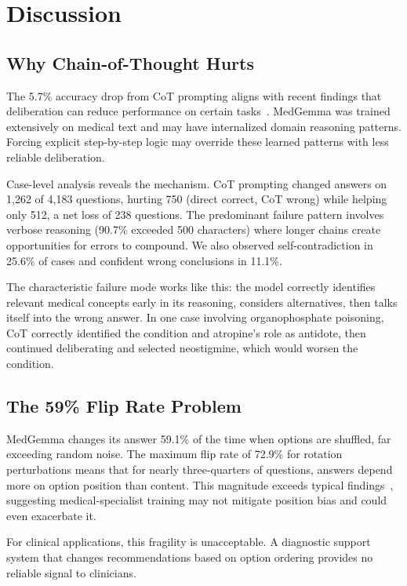 \documentclass[runningheads,a4paper]{llncs}
\begin{document}
\section{Discussion}

\subsection{Why Chain-of-Thought Hurts}

The 5.7\% accuracy drop from CoT prompting aligns with recent findings that deliberation can reduce performance on certain tasks~\cite{liu2024mindyourstep}. MedGemma was trained extensively on medical text and may have internalized domain reasoning patterns. Forcing explicit step-by-step logic may override these learned patterns with less reliable deliberation.

Case-level analysis reveals the mechanism. CoT prompting changed answers on 1,262 of 4,183 questions, hurting 750 (direct correct, CoT wrong) while helping only 512, a net loss of 238 questions. The predominant failure pattern involves verbose reasoning (90.7\% exceeded 500 characters) where longer chains create opportunities for errors to compound. We also observed self-contradiction in 25.6\% of cases and confident wrong conclusions in 11.1\%.

The characteristic failure mode works like this: the model correctly identifies relevant medical concepts early in its reasoning, considers alternatives, then talks itself into the wrong answer. In one case involving organophosphate poisoning, CoT correctly identified the condition and atropine's role as antidote, then continued deliberating and selected neostigmine, which would worsen the condition.

\subsection{The 59\% Flip Rate Problem}

MedGemma changes its answer 59.1\% of the time when options are shuffled, far exceeding random noise. The maximum flip rate of 72.9\% for rotation perturbations means that for nearly three-quarters of questions, answers depend more on option position than content. This magnitude exceeds typical findings~\cite{zheng2024llm}, suggesting medical-specialist training may not mitigate position bias and could even exacerbate it.

For clinical applications, this fragility is unacceptable. A diagnostic support system that changes recommendations based on option ordering provides no reliable signal to clinicians.
\end{document}
